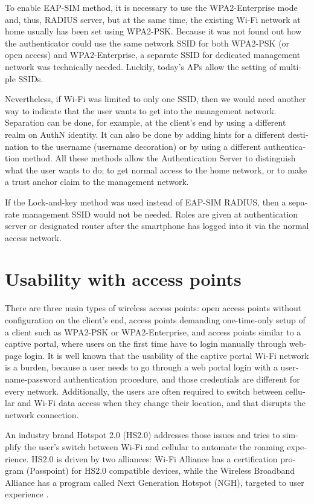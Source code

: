 \documentclass[12pt,a4paper,english]{tutthesis}
\begin{document}
\begin{otherlanguage}{english}
To enable EAP-SIM method, it is necessary to use the WPA2-Enterprise
mode and, thus,
 RADIUS server, but at the same time, the existing Wi-Fi network at
home usually has been set using WPA2-PSK.
Because it was not found out how the authenticator could use the same network
SSID for both WPA2-PSK (or open access) and WPA2-Enterprise, a
separate SSID for dedicated management network was technically needed.
Luckily, today's APs allow the setting of multiple SSIDs.

Nevertheless, if Wi-Fi was limited to only one SSID, then we would
need another 
way to indicate that the user wants to get into the management network. 
Separation can be done, for example, at the client's  end by using a different realm on
AuthN identity. It can also be done by adding hints for a different
destination to the
username (username decoration) or by using a different authentication
method. All these methods allow the Authentication Server to distinguish what the user
wants to do; to get normal access to the home network, or to make a trust anchor claim to 
the management network.

If the Lock-and-key method was used instead of EAP-SIM RADIUS, then
a separate manage\-ment SSID would not be needed. Roles are given at
authentication server or designated router after the smartphone has
logged into it via the normal access network.


\section{Usability with access points}
\label{sec-6-4}
There are three main types of wireless access points: open access
points without configuration on the client's end, access points 
demanding one-time-only setup of a client such as WPA2-PSK or
WPA2-Enterprise, and access points similar to a captive portal, where
users on the first time have to login manually through web-page login.
It is well known that the usability of the captive portal Wi-Fi
 network is a burden, because a user needs to go through 
a web portal login with a username-password authentication 
procedure, and those credentials are different for every network.
Additionally, the users are often required to switch 
between cellular and  Wi-Fi data access when they change their
 location, and that disrupts the network connection.

An industry brand  Hotspot 2.0 (HS2.0) addresses those issues and tries to
simplify the user's switch between Wi-Fi and cellular to automate the
roaming experience.  HS2.0 is driven by two alliances:
Wi-Fi Alliance has a certification program (Passpoint)
for HS2.0 compatible devices, while the Wireless Broadband
Alliance has a program called Next Generation Hotspot (NGH), targeted
to user experience \cite{wba-ngh}.


\end{otherlanguage}
\end{document}
